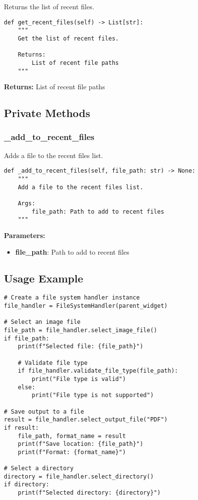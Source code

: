 Returns the list of recent files.

\begin{verbatim}
def get_recent_files(self) -> List[str]:
    """
    Get the list of recent files.
    
    Returns:
        List of recent file paths
    """
\end{verbatim}

\textbf{Returns:} List of recent file paths

\subsection{Private Methods}

\subsubsection{\_add\_to\_recent\_files}

Adds a file to the recent files list.

\begin{verbatim}
def _add_to_recent_files(self, file_path: str) -> None:
    """
    Add a file to the recent files list.
    
    Args:
        file_path: Path to add to recent files
    """
\end{verbatim}

\textbf{Parameters:}
\begin{itemize}
    \item \textbf{file\_path}: Path to add to recent files
\end{itemize}

\subsection{Usage Example}

\begin{verbatim}
# Create a file system handler instance
file_handler = FileSystemHandler(parent_widget)

# Select an image file
file_path = file_handler.select_image_file()
if file_path:
    print(f"Selected file: {file_path}")
    
    # Validate file type
    if file_handler.validate_file_type(file_path):
        print("File type is valid")
    else:
        print("File type is not supported")

# Save output to a file
result = file_handler.select_output_file("PDF")
if result:
    file_path, format_name = result
    print(f"Save location: {file_path}")
    print(f"Format: {format_name}")

# Select a directory
directory = file_handler.select_directory()
if directory:
    print(f"Selected directory: {directory}")
\end{verbatim} 